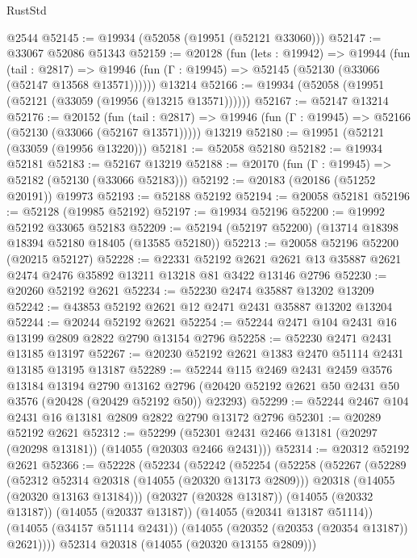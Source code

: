 \begin{lexlean}{RustStd}
\begin{coremodule}
    @2544
@52145 := @19934 (@52058 (@19951 (@52121 @33060)))
@52147 := @33067 @52086 @51343
@52159 := @20128
    (fun (lets : @19942) =>
    @19944
      (fun (tail : @2817) =>
      @19946 (fun (Γ : @19945) => @52145 (@52130 (@33066 (@52147 @13568 @13571))))))
    @13214
@52166 := @19934 (@52058 (@19951 (@52121 (@33059 (@19956 (@13215 @13571))))))
@52167 := @52147 @13214
@52176 := @20152
    (fun (tail : @2817) => @19946 (fun (Γ : @19945) => @52166 (@52130 (@33066 (@52167 @13571)))))
    @13219
@52180 := @19951 (@52121 (@33059 (@19956 @13220)))
@52181 := @52058 @52180
@52182 := @19934 @52181
@52183 := @52167 @13219
@52188 := @20170 (fun (Γ : @19945) => @52182 (@52130 (@33066 @52183)))
@52192 := @20183 (@20186 (@51252 @20191)) @19973
@52193 := @52188 @52192
@52194 := @20058 @52181
@52196 := @52128 (@19985 @52192)
@52197 := @19934 @52196
@52200 := @19992 @52192 @33065 @52183
@52209 := @52194 (@52197 @52200) (@13714 @18398 @18394 @52180 @18405 (@13585 @52180))
@52213 := @20058 @52196 @52200 (@20215 @52127)
@52228 := @22331
    @52192
    @2621
    @2621
    @13
    @35887
    @2621
    @2474
    @2476
    @35892
    @13211
    @13218
    @81
    @3422
    @13146
    @2796
@52230 := @20260 @52192 @2621
@52234 := @52230 @2474 @35887 @13202 @13209
@52242 := @43853 @52192 @2621 @12 @2471 @2431 @35887 @13202 @13204
@52244 := @20244 @52192 @2621
@52254 := @52244 @2471 @104 @2431 @16 @13199 @2809 @2822 @2790 @13154 @2796
@52258 := @52230 @2471 @2431 @13185 @13197
@52267 := @20230 @52192 @2621 @1383 @2470 @51114 @2431 @13185 @13195 @13187
@52289 := @52244
    @115
    @2469
    @2431
    @2459
    @3576
    @13184
    @13194
    @2790
    @13162
    @2796
    (@20420 @52192 @2621 @50 @2431 @50 @3576 (@20428 (@20429 @52192 @50)) @23293)
@52299 := @52244 @2467 @104 @2431 @16 @13181 @2809 @2822 @2790 @13172 @2796
@52301 := @20289 @52192 @2621
@52312 := @52299 (@52301 @2431 @2466 @13181 (@20297 (@20298 @13181)) (@14055 (@20303 @2466 @2431)))
@52314 := @20312 @52192 @2621
@52366 := @52228
    (@52234
      (@52242
        (@52254
          (@52258
            (@52267
              (@52289
                (@52312 @52314 @20318 (@14055 (@20320 @13173 @2809)))
                @20318
                (@14055 (@20320 @13163 @13184)))
              (@20327 (@20328 @13187))
              (@14055 (@20332 @13187))
              (@14055 (@20337 @13187))
              (@14055 (@20341 @13187 @51114))
              (@14055 (@34157 @51114 @2431))
              (@14055 (@20352 (@20353 (@20354 @13187)) @2621))))
          @52314
          @20318
          (@14055 (@20320 @13155 @2809)))

\end{coremodule}
\end{lexlean}
